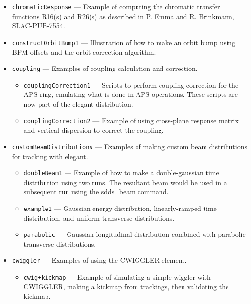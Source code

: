 \begin{itemize}
\item \verb|chromaticResponse| --- 
 Example of computing the chromatic transfer functions R16(s) and R26(s) as described in P. Emma and R. Brinkmann, SLAC-PUB-7554. 

\item \verb|constructOrbitBump1| --- 
 Illustration of how to make an orbit bump using BPM offsets and the orbit correction algorithm. 

\item \verb|coupling| --- 
Examples of coupling calculation and correction.

\begin{itemize}
\item \verb|couplingCorrection1| --- 
 Scripts to perform coupling correction for the APS ring, emulating what is done in APS operations. These scripts are now part of the elegant distribution. 

\item \verb|couplingCorrection2| --- 
 Example of  using cross-plane response matrix and vertical dispersion to correct the coupling. 

\end{itemize}
\item \verb|customBeamDistributions| --- 
 Examples of making custom beam distributions for tracking with elegant. 

\begin{itemize}
\item \verb|doubleBeam1| --- 
 Example of how to make a double-gaussian time distribution using two runs.  The resultant beam would be used in a subsequent run using the sdds\_beam command. 

\item \verb|example1| --- 
 Gaussian energy distribution, linearly-ramped time distribution, and uniform transverse distributions. 

\item \verb|parabolic| --- 
 Gaussian longitudinal distribution combined with parabolic transverse distributions. 

\end{itemize}
\item \verb|cwiggler| --- 
Examples of using the CWIGGLER element.

\begin{itemize}
\item \verb|cwig+kickmap| --- 
 Example of simulating a simple wiggler with CWIGGLER, making a kickmap from trackings, then validating the kickmap. 


\end{itemize}
\end{itemize}
